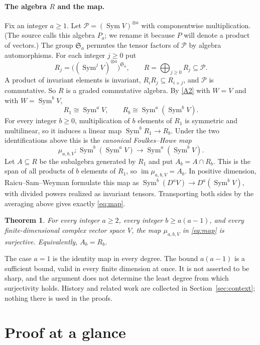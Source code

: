 \documentclass[11pt]{article}
\newtheorem{theorem}{Theorem}
\theoremstyle{remark}
\DeclareMathOperator{\Sym}{Sym}
\newcommand{\Sa}{\mathfrak S_a}
\begin{document}
\paragraph{The algebra $R$ and the map.}
Fix an integer $a\ge1$. Let $\mathcal P=(\Sym V)^{\otimes a}$ with
componentwise multiplication. (The source calls this algebra $P_a$; we
rename it because $P$ will denote a product of vectors.) The group $\Sa$
permutes the tensor factors of $\mathcal P$ by algebra automorphisms. For
each integer $j\ge0$ put
\[
 R_j=\bigl((\Sym^j V)^{\otimes a}\bigr)^{\Sa},\qquad
 R=\bigoplus_{j\ge0}R_j\subseteq\mathcal P .
\]
A product of invariant elements is invariant, $R_iR_j\subseteq R_{i+j}$,
and $\mathcal P$ is commutative. So $R$ is a graded commutative algebra.
By \ref{A2} with $W=V$ and with $W=\Sym^bV$,
\[
 R_1\cong\Sym^aV,\qquad R_b\cong\Sym^a(\Sym^bV).
\]
For every integer $b\ge0$, multiplication of $b$ elements of $R_1$ is
symmetric and multilinear, so it induces a linear map $\Sym^bR_1\to R_b$.
Under the two identifications above this is the \emph{canonical
Foulkes--Howe map}
\begin{equation}\label{eq:map}
 \mu_{a,b,V}:\Sym^b(\Sym^a V)\longrightarrow\Sym^a(\Sym^b V).
\end{equation}
Let $A\subseteq R$ be the subalgebra generated by $R_1$ and put
$A_b=A\cap R_b$. This is the span of all products of $b$ elements of $R_1$,
so $\operatorname{im}\mu_{a,b,V}=A_b$. In positive dimension,
Raicu--Sam--Weyman \cite[Section~2]{RSW} formulate this map as
$\Sym^b(D^aV)\longrightarrow D^a(\Sym^bV)$, with divided powers realized as
invariant tensors. Transporting both sides by the averaging above gives
exactly \eqref{eq:map}.

\begin{theorem}\label{thm:main}
For every integer $a\ge2$, every integer $b\ge a(a-1)$, and every
finite-dimensional complex vector space $V$, the map
$\mu_{a,b,V}$ in \eqref{eq:map} is surjective. Equivalently, $A_b=R_b$.
\end{theorem}

The case $a=1$ is the identity map in every degree. The bound $a(a-1)$ is a
sufficient bound, valid in every finite dimension at once. It is not
asserted to be sharp, and the argument does not determine the least degree
from which surjectivity holds. History and related work are collected in
Section~\ref{sec:context}; nothing there is used in the proofs.

\section{Proof at a glance}\label{sec:glance}
\end{document}
